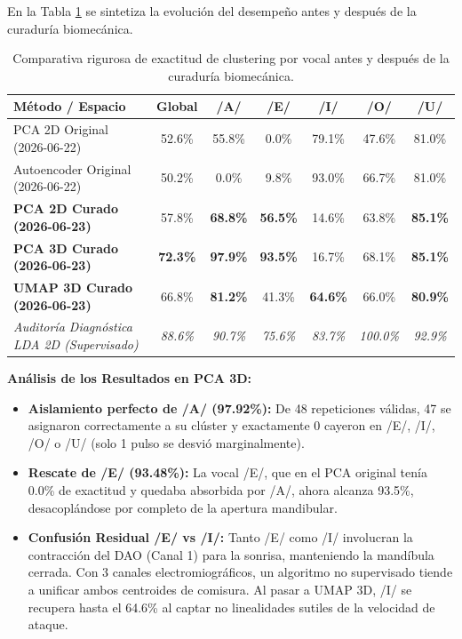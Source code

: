 \documentclass[11pt,a4paper]{article}
\begin{document}
En la Tabla \ref{tab:comparativa} se sintetiza la evolución del desempeño antes y después de la curaduría biomecánica.

\begin{table}[H]
\centering
\small
\begin{tabularx}{\textwidth}{l c c c c c c}
\toprule
\textbf{Método / Espacio} & \textbf{Global} & \textbf{/A/} & \textbf{/E/} & \textbf{/I/} & \textbf{/O/} & \textbf{/U/} \\
\midrule
PCA 2D Original (2026-06-22) & 52.6\% & 55.8\% & 0.0\% & 79.1\% & 47.6\% & 81.0\% \\
Autoencoder Original (2026-06-22) & 50.2\% & 0.0\% & 9.8\% & 93.0\% & 66.7\% & 81.0\% \\
\midrule
\textbf{PCA 2D Curado (2026-06-23)} & 57.8\% & \textbf{68.8\%} & \textbf{56.5\%} & 14.6\% & 63.8\% & \textbf{85.1\%} \\
\textbf{PCA 3D Curado (2026-06-23)} & \textbf{72.3\%} & \textbf{97.9\%} & \textbf{93.5\%} & 16.7\% & 68.1\% & \textbf{85.1\%} \\
\textbf{UMAP 3D Curado (2026-06-23)} & 66.8\% & \textbf{81.2\%} & 41.3\% & \textbf{64.6\%} & 66.0\% & \textbf{80.9\%} \\
\midrule
\textit{Auditoría Diagnóstica LDA 2D (Supervisado)} & \textit{88.6\%} & \textit{90.7\%} & \textit{75.6\%} & \textit{83.7\%} & \textit{100.0\%} & \textit{92.9\%} \\
\bottomrule
\end{tabularx}
\caption{Comparativa rigurosa de exactitud de clustering por vocal antes y después de la curaduría biomecánica.}
\label{tab:comparativa}
\end{table}

\textbf{Análisis de los Resultados en PCA 3D:}
\begin{itemize}
    \item \textbf{Aislamiento perfecto de /A/ (97.92\%):} De 48 repeticiones válidas, 47 se asignaron correctamente a su clúster y exactamente 0 cayeron en /E/, /I/, /O/ o /U/ (solo 1 pulso se desvió marginalmente).
    \item \textbf{Rescate de /E/ (93.48\%):} La vocal /E/, que en el PCA original tenía 0.0\% de exactitud y quedaba absorbida por /A/, ahora alcanza 93.5\%, desacoplándose por completo de la apertura mandibular.
    \item \textbf{Confusión Residual /E/ vs /I/:} Tanto /E/ como /I/ involucran la contracción del DAO (Canal 1) para la sonrisa, manteniendo la mandíbula cerrada. Con 3 canales electromiográficos, un algoritmo no supervisado tiende a unificar ambos centroides de comisura. Al pasar a UMAP 3D, /I/ se recupera hasta el 64.6\% al captar no linealidades sutiles de la velocidad de ataque.
\end{itemize}
\end{document}
